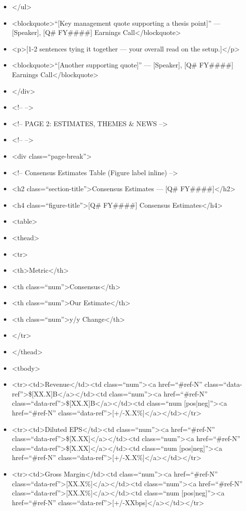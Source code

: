 \documentclass[11pt]{article}
\begin{document}
\begin{itemize}[leftmargin=*,itemsep=2pt,topsep=2pt]
\item {} </ul>
\item {} <blockquote>``[Key management quote supporting a thesis point]'' — [Speaker], [Q\# FY\#\#\#\#] Earnings Call</blockquote>
\item {} <p>[1-2 sentences tying it together — your overall read on the setup.]</p>
\item {} <blockquote>``[Another supporting quote]'' — [Speaker], [Q\# FY\#\#\#\#] Earnings Call</blockquote>
\item {} </div>
\item {} <!-- -->
\item {} <!-- PAGE 2: ESTIMATES, THEMES \& NEWS -->
\item {} <!-- -->
\item {} <div class=``page-break''>
\item {} <!-- Consensus Estimates Table (Figure label inline) -->
\item {} <h2 class=``section-title''>Consensus Estimates — [Q\# FY\#\#\#\#]</h2>
\item {} <h4 class=``figure-title''>[Q\# FY\#\#\#\#] Consensus Estimates</h4>
\item {} <table>
\item {} <thead>
\item {} <tr>
\item {} <th>Metric</th>
\item {} <th class=``num''>Consensus</th>
\item {} <th class=``num''>Our Estimate</th>
\item {} <th class=``num''>y/y Change</th>
\item {} </tr>
\item {} </thead>
\item {} <tbody>
\item {} <tr><td>Revenue</td><td class=``num''><a href=``\#ref-N'' class=``data-ref''>\$[XX.X]B</a></td><td class=``num''><a href=``\#ref-N'' class=``data-ref''>\$[XX.X]B</a></td><td class=``num [pos|neg]''><a href=``\#ref-N'' class=``data-ref''>[+/-X.X\%]</a></td></tr>
\item {} <tr><td>Diluted EPS</td><td class=``num''><a href=``\#ref-N'' class=``data-ref''>\$[X.XX]</a></td><td class=``num''><a href=``\#ref-N'' class=``data-ref''>\$[X.XX]</a></td><td class=``num [pos|neg]''><a href=``\#ref-N'' class=``data-ref''>[+/-X.X\%]</a></td></tr>
\item {} <tr><td>Gross Margin</td><td class=``num''><a href=``\#ref-N'' class=``data-ref''>[XX.X\%]</a></td><td class=``num''><a href=``\#ref-N'' class=``data-ref''>[XX.X\%]</a></td><td class=``num [pos|neg]''><a href=``\#ref-N'' class=``data-ref''>[+/-XXbps]</a></td></tr>

\end{itemize}
\end{document}
